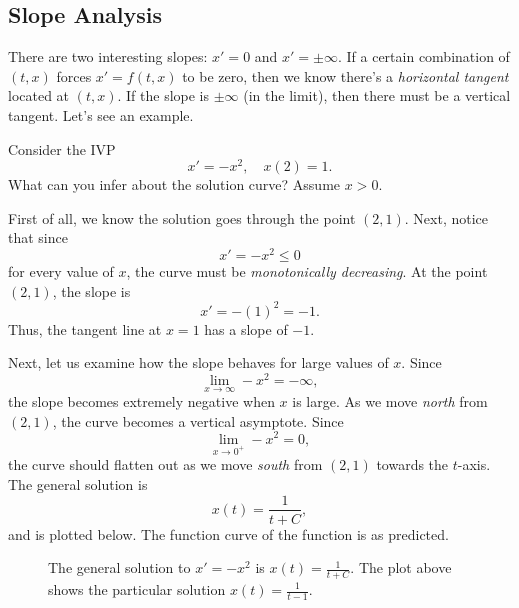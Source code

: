 \documentclass[09pt,letterpaper]{article}
\begin{document}

\subsection{Slope Analysis}
There are two interesting slopes: $x'=0$ and $x'=\pm\infty$. If a certain combination of $(t,x)$ forces $x'=f(t,x)$ to be zero, then we know there's a \textit{horizontal tangent} located at $(t,x)$. If the slope is $\pm\infty$ (in the limit), then there must be a vertical tangent. Let's see an example. 


\begin{example}[4]{

Consider the IVP
\[
x'=-x^2, \quad x(2)=1.
\]
What can you infer about the solution curve? Assume $x>0$. 
}
\vspace{1em}

First of all, we know the solution goes through the point $(2,1)$. Next, notice that since
\[
x'=-x^2 \leq 0
\]
for every value of $x$, the curve must be \textit{monotonically decreasing}. At the point $(2,1)$, the slope is
\[
x' = -(1)^2 = -1.
\]
Thus, the tangent line at $x=1$ has a slope of $-1$.

Next, let us examine how the slope behaves for large values of $x$. Since
\[
\lim_{x\to\infty} -x^2 = -\infty,
\]
the slope becomes extremely negative when $x$ is large. As we move \emph{north} from $(2,1)$, the curve becomes a vertical asymptote. Since
\[
\lim_{x\to 0^+} -x^2 = 0,
\]
the curve should flatten out as we move \emph{south} from $(2,1)$ towards the $t$-axis. The general solution is
\[
x(t)=\frac{1}{t+C},
\]
and is plotted below. The function curve of the function is as predicted.

\begin{figure}[H]
\centering
{}
\caption{The general solution to $x'=-x^2$ is $x(t)=\frac{1}{t+C}$. The plot above shows the particular solution $x(t) = \frac{1}{t-1}$.}
\end{figure}
\end{example}
\end{document}
